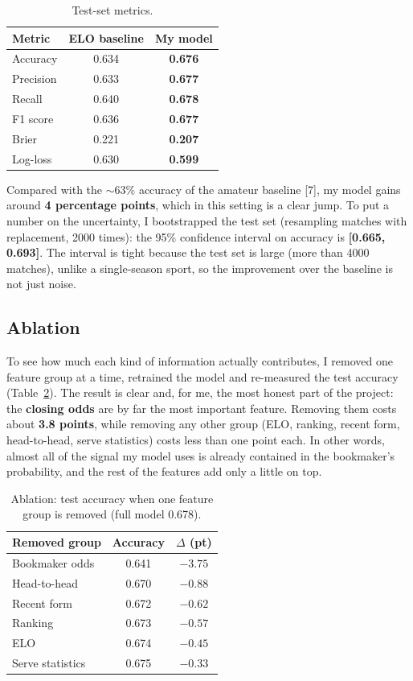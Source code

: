 \documentclass[10pt,twocolumn]{article}
\begin{document}
\begin{table}[t]
\centering
\caption{Test-set metrics.}
\label{tab:metrics}
\begin{tabular}{lcc}
\toprule
Metric & ELO baseline & My model \\
\midrule
Accuracy   & 0.634 & \textbf{0.676} \\
Precision  & 0.633 & \textbf{0.677} \\
Recall     & 0.640 & \textbf{0.678} \\
F1 score   & 0.636 & \textbf{0.677} \\
Brier      & 0.221 & \textbf{0.207} \\
Log-loss   & 0.630 & \textbf{0.599} \\
\bottomrule
\end{tabular}
\end{table}

Compared with the \(\sim 63\%\) accuracy of the amateur baseline [7], my
model gains around \textbf{4 percentage points}, which in this setting
is a clear jump. To put a number on the uncertainty, I bootstrapped the
test set (resampling matches with replacement, 2000 times): the 95\%
confidence interval on accuracy is \textbf{[0.665, 0.693]}. The interval
is tight because the test set is large (more than \num{4000} matches),
unlike a single-season sport, so the improvement over the baseline is not
just noise.

\subsection{Ablation}
To see how much each kind of information actually contributes, I removed one
feature group at a time, retrained the model and re-measured the test
accuracy (Table~\ref{tab:ablation}). The result is clear and, for me, the most
honest part of the project: the \textbf{closing odds} are by far the most
important feature. Removing them costs about \textbf{3.8 points}, while removing
any other group (ELO, ranking, recent form, head-to-head, serve statistics)
costs less than one point each. In other words, almost all of the signal my
model uses is already contained in the bookmaker's probability, and the rest of
the features add only a little on top.

\begin{table}[t]
\centering
\caption{Ablation: test accuracy when one feature group is removed
(full model 0.678).}
\label{tab:ablation}
\small
\begin{tabular}{@{}lcc@{}}
\toprule
Removed group & Accuracy & $\Delta$ (pt) \\
\midrule
Bookmaker odds   & 0.641 & $-3.75$ \\
Head-to-head     & 0.670 & $-0.88$ \\
Recent form      & 0.672 & $-0.62$ \\
Ranking          & 0.673 & $-0.57$ \\
ELO              & 0.674 & $-0.45$ \\
Serve statistics & 0.675 & $-0.33$ \\
\bottomrule
\end{tabular}
\end{table}
\end{document}
